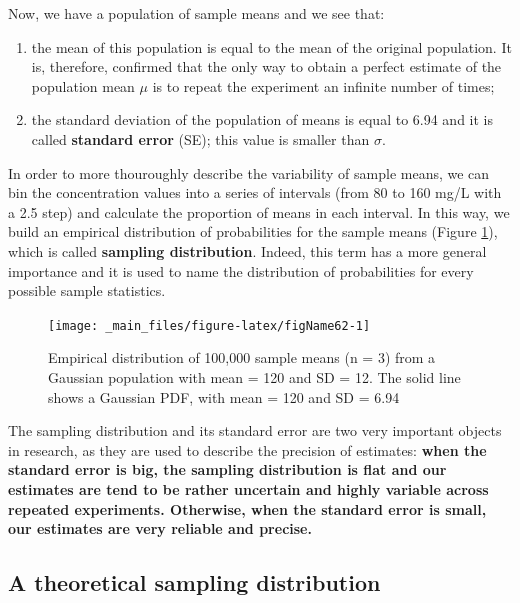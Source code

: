 \documentclass[a4paper,12pt,oneside]{book}
\providecommand{\tightlist}{%
  \setlength{\itemsep}{0pt}\setlength{\parskip}{0pt}}
\begin{document}
Now, we have a population of sample means and we see that:

\begin{enumerate}
\def\labelenumi{\arabic{enumi}.}
\tightlist
\item
  the mean of this population is equal to the mean of the original population. It is, therefore, confirmed that the only way to obtain a perfect estimate of the population mean \(\mu\) is to repeat the experiment an infinite number of times;
\item
  the standard deviation of the population of means is equal to 6.94 and it is called \textbf{standard error} (SE); this value is smaller than \(\sigma\).
\end{enumerate}

In order to more thouroughly describe the variability of sample means, we can bin the concentration values into a series of intervals (from 80 to 160 mg/L with a 2.5 step) and calculate the proportion of means in each interval. In this way, we build an empirical distribution of probabilities for the sample means (Figure \ref{fig:figName62}), which is called \textbf{sampling distribution}. Indeed, this term has a more general importance and it is used to name the distribution of probabilities for every possible sample statistics.

\begin{figure}

{\centering \texttt{[image: \_main\_files/figure-latex/figName62-1]} 

}

\caption{Empirical distribution of 100,000 sample means (n = 3) from a Gaussian population with mean = 120 and SD = 12. The solid line shows a Gaussian PDF, with mean = 120 and SD = 6.94}\label{fig:figName62}
\end{figure}

The sampling distribution and its standard error are two very important objects in research, as they are used to describe the precision of estimates: \textbf{when the standard error is big, the sampling distribution is flat and our estimates are tend to be rather uncertain and highly variable across repeated experiments. Otherwise, when the standard error is small, our estimates are very reliable and precise.}

\hypertarget{a-theoretical-sampling-distribution}{%
\subsection{A theoretical sampling distribution}\label{a-theoretical-sampling-distribution}}
\end{document}
